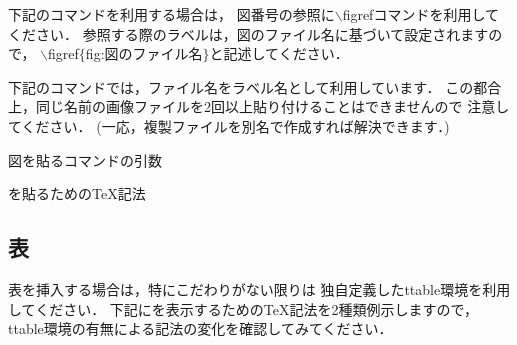 下記のコマンドを利用する場合は，
図番号の参照に$\backslash$figrefコマンドを利用してください．
参照する際のラベルは，図のファイル名に基づいて設定されますので，
$\backslash$figref$\{$fig:図のファイル名$\}$と記述してください．

下記のコマンドでは，ファイル名をラベル名として利用しています．
この都合上，同じ名前の画像ファイルを2回以上貼り付けることはできませんので
注意してください．
(一応，複製ファイルを別名で作成すれば解決できます．)
%
\begin{lstbox}{図を貼るコマンドの引数}
\begin{minilst}
\end{minilst}
\end{lstbox}
%
%
\begin{lstbox}{を貼るためのTeX記法}
\begin{minilst}
\end{minilst}
\end{lstbox}

\subsection{表}
表を挿入する場合は，特にこだわりがない限りは
独自定義したttable環境を利用してください．
下記にを表示するためのTeX記法を2種類例示しますので，
ttable環境の有無による記法の変化を確認してみてください．

